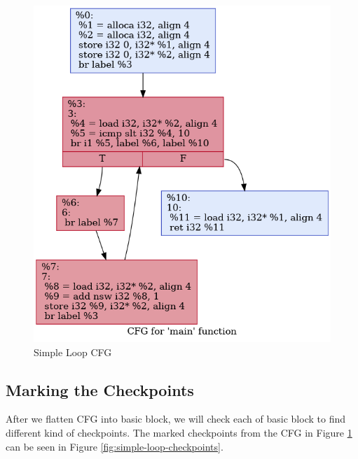 \begin{figure}[htbp]
\centerline{\includegraphics[scale=.5]{Figures/04/simple-loop.png}}
\caption{Simple Loop CFG}
\label{fig:simple-loop-cfg}
\end{figure}

\subsection{Marking the Checkpoints}


After we flatten CFG into basic block, we will check each of basic block to 
find different kind of checkpoints. The marked checkpoints from the CFG in 
Figure \ref{fig:simple-loop-cfg} can be seen in Figure 
\ref{fig:simple-loop-checkpoints}.


